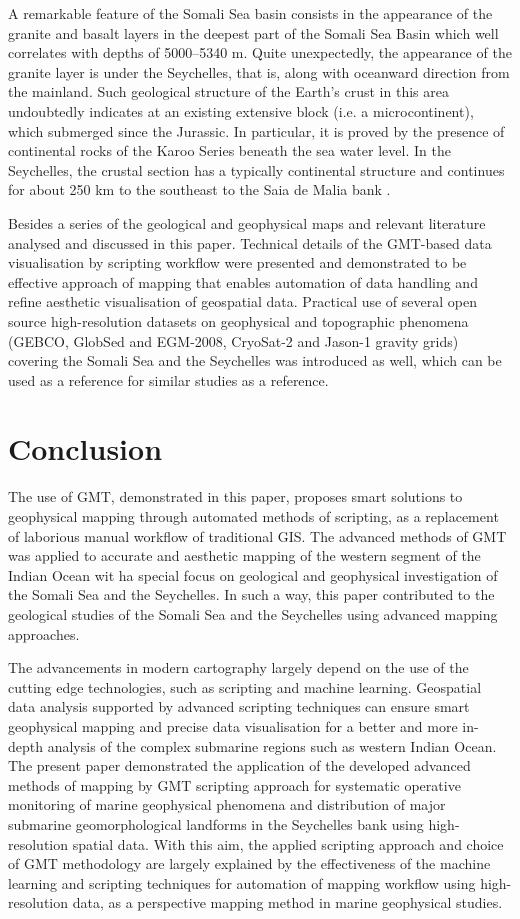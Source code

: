 \documentclass[]{interact}
\begin{document}
A remarkable feature of the Somali Sea basin consists in the appearance of the granite and basalt layers in the deepest part of the Somali Sea Basin which well correlates with depths of 5000–5340 m. Quite unexpectedly, the appearance of the granite layer is under the Seychelles, that is, along with oceanward direction from the mainland. Such geological structure of the Earth's crust in this area undoubtedly indicates at an existing extensive block (i.e. a microcontinent), which submerged since the Jurassic. In particular, it is proved by the presence of continental rocks of the Karoo Series beneath the sea water level. In the Seychelles, the crustal section has a typically continental structure and continues for about 250 km to the southeast to the Saia de Malia bank \cite{MatthewsDavies}.

Besides a series of the geological and geophysical maps and relevant literature analysed and discussed in this paper. Technical details of the GMT-based data visualisation by scripting workflow were presented and demonstrated to be effective approach of mapping that enables automation of data handling and refine aesthetic visualisation of geospatial data. Practical use of several open source high-resolution datasets on geophysical and topographic phenomena (GEBCO, GlobSed and EGM-2008, CryoSat-2 and Jason-1 gravity grids) covering the Somali Sea and the Seychelles was introduced as well, which can be used as a reference for similar studies as a reference.  

\section{Conclusion}

The use of GMT, demonstrated in this paper, proposes smart solutions to geophysical mapping through automated methods of scripting, as a replacement of laborious manual workflow of traditional GIS. The advanced methods of GMT was applied to accurate and aesthetic mapping of the western segment of the Indian Ocean wit ha special focus on geological and geophysical investigation of the Somali Sea and the Seychelles. In such a way, this paper contributed to the geological studies of the Somali Sea and the Seychelles using advanced mapping approaches.

The advancements in modern cartography largely depend on the use of the cutting edge technologies, such as scripting and machine learning. Geospatial data analysis supported by advanced scripting techniques can ensure smart geophysical mapping and precise data visualisation for a better and more in-depth analysis of the complex submarine regions such as western Indian Ocean. The present paper demonstrated the application of the developed advanced methods of mapping by GMT scripting approach for systematic operative monitoring of marine geophysical phenomena and distribution of major submarine geomorphological landforms in the Seychelles bank using high-resolution spatial data. 
With this aim, the applied scripting approach and choice of GMT methodology are largely explained by the effectiveness of the machine learning and scripting techniques for automation of mapping workflow using high-resolution data, as a perspective mapping method in marine geophysical studies. 
\end{document}

